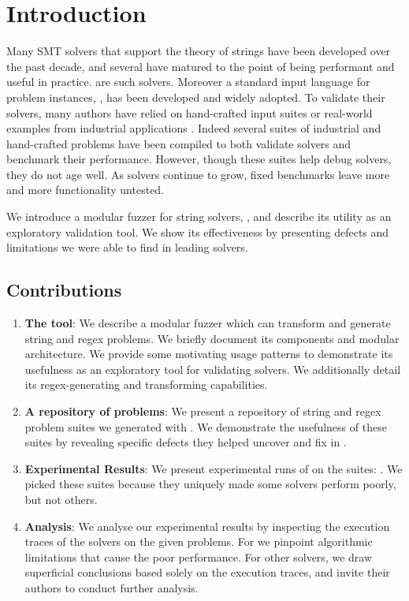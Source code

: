 \section{Introduction}

    Many SMT solvers that support the theory of strings have been developed over the past decade, and several have matured to the point of being performant and useful in practice. \theSolvers{}\cite{cvc4}\cite{z3str3} are \numSolvers{} such solvers. Moreover a standard input language for problem instances, \smtfull{}\cite{smt}, has been developed and widely adopted. To validate their solvers, many authors have relied on hand-crafted input suites or real-world examples from industrial applications \cite{cvc4-tests} \cite{z3str3-tests} \cite{z3str2-tests}. Indeed several suites of industrial and hand-crafted problems have been compiled \cite{kaluza} \cite{kausler} to both validate solvers and benchmark their performance. However, though these suites help debug solvers, they do not age well. As solvers continue to grow, fixed benchmarks leave more and more functionality untested.

    We introduce a modular fuzzer for string solvers, \fuzzer{}, and describe its utility as an exploratory validation tool. We show its effectiveness by presenting defects and limitations we were able to find in leading solvers.

    \subsection{Contributions}

        \begin{enumerate}
            \item \textbf{The \fuzzer{} tool}: We describe a modular fuzzer which can transform and generate \smtfull{} string and regex problems. We briefly document its components and modular architecture. We provide some motivating usage patterns to demonstrate its usefulness as an exploratory tool for validating solvers. We additionally detail its regex-generating and transforming capabilities.
            \item \textbf{A repository of \smtfull{} problems}: We present a repository of \smtfull{} string and regex problem suites we generated with \fuzzer{}. We demonstrate the usefulness of these suites by revealing specific defects they helped uncover and fix in \us{}.
            \item \textbf{Experimental Results}: We present experimental runs of \theSolvers{} on the \fuzzer{} suites: \theSuites{}. We picked these suites because they uniquely made some solvers perform poorly, but not others.
            \item \textbf{Analysis}: We analyse our experimental results by inspecting the execution traces of the solvers on the given problems. For \us{} we pinpoint algorithmic limitations that cause the poor performance. For other solvers, we draw superficial conclusions based solely on the execution traces, and invite their authors to conduct further analysis.
        \end{enumerate}
